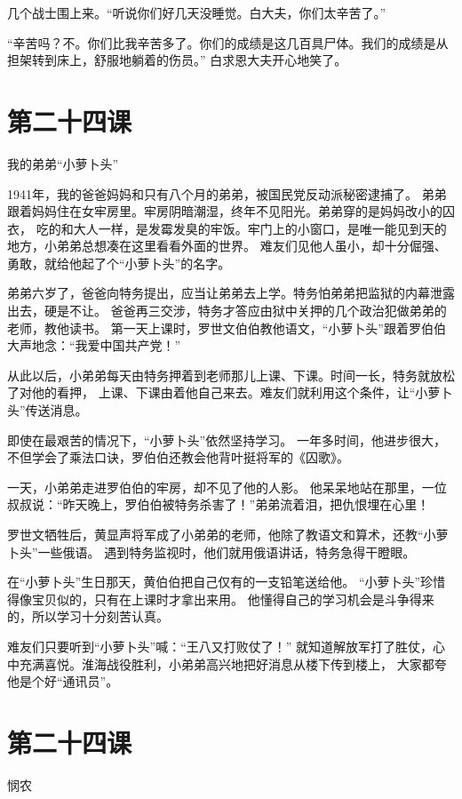 \documentclass[12pt,UTF8]{ctexbook}
\begin{document}
几个战士围上来。“听说你们好几天没睡觉。白大夫，你们太辛苦了。”

“辛苦吗？不。你们比我辛苦多了。你们的成绩是这几百具尸体。我们的成绩是从担架转到床上，舒服地躺着的伤员。”
白求恩大夫开心地笑了。

\section{第二十四课}

我的弟弟“小萝卜头”

1941年，我的爸爸妈妈和只有八个月的弟弟，被国民党反动派秘密逮捕了。
弟弟跟着妈妈住在女牢房里。牢房阴暗潮湿，终年不见阳光。弟弟穿的是妈妈改小的囚衣，
吃的和大人一样，是发霉发臭的牢饭。牢门上的小窗口，是唯一能见到天的地方，小弟弟总想凑在这里看看外面的世界。
难友们见他人虽小，却十分倔强、勇敢，就给他起了个“小萝卜头”的名字。

弟弟六岁了，爸爸向特务提出，应当让弟弟去上学。特务怕弟弟把监狱的内幕泄露出去，硬是不让。
爸爸再三交涉，特务才答应由狱中关押的几个政治犯做弟弟的老师，教他读书。
第一天上课时，罗世文伯伯教他语文，“小萝卜头”跟着罗伯伯大声地念：“我爱中国共产党！”

从此以后，小弟弟每天由特务押着到老师那儿上课、下课。时间一长，特务就放松了对他的看押，
上课、下课由着他自己来去。难友们就利用这个条件，让“小萝卜头”传送消息。

即使在最艰苦的情况下，“小萝卜头”依然坚持学习。
一年多时间，他进步很大，不但学会了乘法口诀，罗伯伯还教会他背叶挺将军的《囚歌》。

一天，小弟弟走进罗伯伯的牢房，却不见了他的人影。
他呆呆地站在那里，一位叔叔说：“昨天晚上，罗伯伯被特务杀害了！”弟弟流着泪，把仇恨埋在心里！

罗世文牺牲后，黄显声将军成了小弟弟的老师，他除了教语文和算术，还教“小萝卜头”一些俄语。
遇到特务监视时，他们就用俄语讲话，特务急得干瞪眼。

在“小萝卜头”生日那天，黄伯伯把自己仅有的一支铅笔送给他。
“小萝卜头”珍惜得像宝贝似的，只有在上课时才拿出来用。
他懂得自己的学习机会是斗争得来的，所以学习十分刻苦认真。

难友们只要听到“小萝卜头”喊：“王八又打败仗了！”
就知道解放军打了胜仗，心中充满喜悦。淮海战役胜利，小弟弟高兴地把好消息从楼下传到楼上，
大家都夸他是个好“通讯员”。

\section{第二十四课}

悯农
\end{document}
